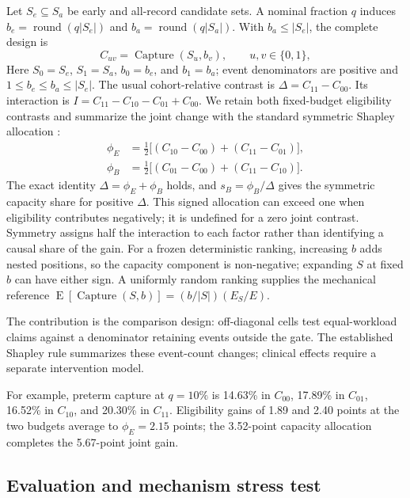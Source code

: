 \documentclass{article}
\newcommand{\capture}{\operatorname{Capture}}
\begin{document}
Let $S_e\subseteq S_a$ be early and all-record candidate sets. A nominal
fraction $q$ induces $b_e=\operatorname{round}(q|S_e|)$ and
$b_a=\operatorname{round}(q|S_a|)$. With $b_a\leq |S_e|$, the complete design is
\begin{equation}
  C_{uv}=\capture(S_u,b_v),\qquad u,v\in\{0,1\},
  \label{eq:fourcell}
\end{equation}
Here $S_0=S_e$, $S_1=S_a$, $b_0=b_e$, and $b_1=b_a$; event denominators are
positive and $1\leq b_e\leq b_a\leq |S_e|$. The
usual cohort-relative contrast is $\Delta=C_{11}-C_{00}$. Its interaction is
$I=C_{11}-C_{10}-C_{01}+C_{00}$. We retain both fixed-budget eligibility
contrasts and summarize the joint change with the standard symmetric Shapley
allocation \citep{shapley1953value}:
\begin{equation}
\begin{aligned}
  \phi_E&=\tfrac12\big[(C_{10}-C_{00})+(C_{11}-C_{01})\big],\\
  \phi_B&=\tfrac12\big[(C_{01}-C_{00})+(C_{11}-C_{10})\big].
\end{aligned}
\label{eq:shapley}
\end{equation}
The exact identity $\Delta=\phi_E+\phi_B$ holds, and
$s_B=\phi_B/\Delta$ gives the symmetric capacity share for positive $\Delta$.
This signed allocation can exceed one when eligibility contributes negatively;
it is undefined for a zero joint contrast. Symmetry assigns half the interaction
to each factor rather than identifying a causal share of the gain.
For a frozen deterministic ranking, increasing $b$ adds nested positions, so
the capacity component is non-negative; expanding $S$ at fixed $b$ can have
either sign. A uniformly random ranking supplies the mechanical reference
$\operatorname{E}[\capture(S,b)]=(b/|S|)(E_S/E)$.

The contribution is the comparison design: off-diagonal cells test
equal-workload claims against a denominator retaining events outside the gate.
The established Shapley rule summarizes these event-count changes; clinical
effects require a separate intervention model.

For example, preterm capture at $q=10\%$ is 14.63\% in $C_{00}$, 17.89\% in
$C_{01}$, 16.52\% in $C_{10}$, and 20.30\% in $C_{11}$. Eligibility gains of
1.89 and 2.40 points at the two budgets average to $\phi_E=2.15$ points;
the 3.52-point capacity allocation completes the 5.67-point joint gain.

\subsection{Evaluation and mechanism stress test}
\end{document}

